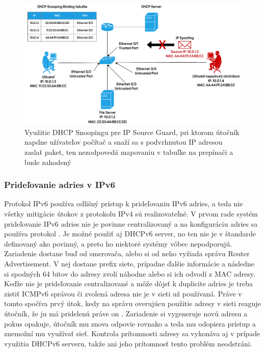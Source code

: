 \begin{figure}[H]
	\begin{center}
		\includegraphics[scale=0.75]{obrazky/dhcp-snoop.pdf}
	\end{center}
	\caption[DHCP Snooping a IP Source Guard]{Využitie DHCP Snoopingu pre IP Source Guard, pri ktorom útočník napdne užívateľov počítač a snaží sa s podvrhnutou IP adresou zaslať paket, ten nezodpovedá mapovaniu v tabuľke na prepínači a bude zahodený}
	\label{fig:dhcpsnoop}
\end{figure}    

\subsubsection*{Prideľovanie adries v IPv6}
Protokol IPv6 používa odlišný prístup k prideľovaniu IPv6 adries, a teda nie všetky mitigácie útokov z protokolu IPv4 sú realizovateľné. V prvom rade systém prideľovanie IPv6 adries nie je povinne centralizovaný a na konfiguráciu adries sa používa protokol . Je možné použiť aj DHCPv6 server, no ten nie je v štandarde definovaný ako povinný, a preto ho niektoré systémy vôbec nepodporujú. Zariadenie dostane buď od smerovača, alebo si od neho  vyžiada správu Router Advertisement. V nej dostane prefix siete, prípadne ďalšie informácie a následne si spodných 64 bitov do adresy zvolí náhodne alebo si ich odvodí z MAC adresy. Keďže nie je prideľovanie centralizované a môže dôjsť k duplicite adries je treba zistiť ICMPv6 správou či zvolená adresa nie je v sieti už používaná. Práve v tomto spočíva prvý útok, kedy na správu overujúcu použitie adresy v sieti reaguje útočník, že ju má pridelenú práve on \cite{Hg83oflOfHBGeWfs}. Zariadenie si vygeneruje novú adresu a pokus opakuje, útočník mu znova odpovie rovnako a teda mu odopiera prístup a znemožní mu využívať sieť. Kontrola prítomnosti adresy sa vykonáva aj v prípade využitia DHCPv6 serveru, takže ani jeho prítomnosť tento problém neodstráni. 

